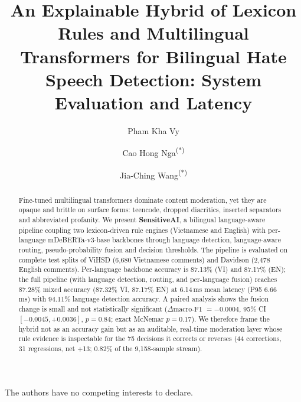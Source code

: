\documentclass[runningheads]{llncs}
\begin{document}
\title{An Explainable Hybrid of Lexicon Rules and Multilingual Transformers for
       Bilingual Hate Speech Detection: System Evaluation and Latency}
\author{
Pham Kha Vy
 \and
Cao Hong Nga\textsuperscript{(*)}
\and
Jia-Ching Wang\textsuperscript{(*)}
}

\maketitle

\begin{abstract}
Fine-tuned multilingual transformers dominate content moderation, yet they are
opaque and brittle on surface forms: teencode, dropped diacritics, inserted
separators and abbreviated profanity.  We present \textbf{SensitiveAI}, a
bilingual language-aware pipeline coupling two lexicon-driven rule engines
(Vietnamese and English) with per-language mDeBERTa-v3-base backbones through
language detection, language-aware routing, pseudo-probability fusion and
decision thresholds.  The pipeline is evaluated on complete test splits of
ViHSD (6{,}680 Vietnamese comments) and Davidson (2{,}478 English comments).
Per-language backbone accuracy is 87.13\% (VI) and 87.17\% (EN); the full
pipeline (with language detection, routing, and per-language fusion) reaches
87.28\% mixed accuracy (87.32\% VI, 87.17\% EN) at 6.14\,ms mean latency
(P95 6.66\,ms) with 94.11\% language detection accuracy.  A paired analysis
shows the fusion change is small and not statistically significant
($\Delta$macro-F1 $=-0.0004$, 95\% CI $[-0.0045,+0.0036]$, $p=0.84$; exact
McNemar $p=0.17$).  We therefore frame the hybrid not as an accuracy gain but
as an auditable, real-time moderation layer whose rule evidence is inspectable
for the 75 decisions it corrects or reverses (44 corrections, 31
regressions, net +13; 0.82\% of the 9{,}158-sample stream).
\end{abstract}












\credits
\subsubsection{\discintname}
The authors have no competing interests to declare.



\end{document}
